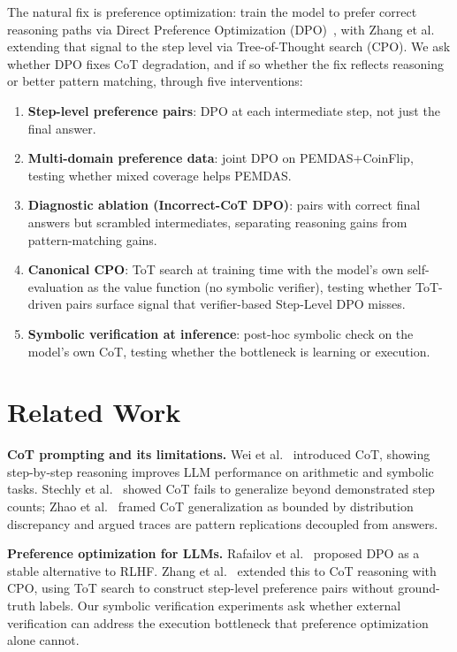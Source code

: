 \documentclass{article}
\begin{document}
The natural fix is preference optimization: train the model to prefer correct reasoning paths via Direct Preference Optimization (DPO)~\cite{rafailov2023dpo}, with Zhang et al.~\cite{zhang2024cpo} extending that signal to the step level via Tree-of-Thought search (CPO). We ask whether DPO fixes CoT degradation, and if so whether the fix reflects reasoning or better pattern matching, through five interventions:
\begin{enumerate}
  \item \textbf{Step-level preference pairs}: DPO at each intermediate step, not just the final answer.
  \item \textbf{Multi-domain preference data}: joint DPO on PEMDAS+CoinFlip, testing whether mixed coverage helps PEMDAS.
  \item \textbf{Diagnostic ablation (Incorrect-CoT DPO)}: pairs with correct final answers but scrambled intermediates, separating reasoning gains from pattern-matching gains.
  \item \textbf{Canonical CPO}: ToT search at training time with the model's own self-evaluation as the value function (no symbolic verifier), testing whether ToT-driven pairs surface signal that verifier-based Step-Level DPO misses.
  \item \textbf{Symbolic verification at inference}: post-hoc symbolic check on the model's own CoT, testing whether the bottleneck is learning or execution.
\end{enumerate}

\section{Related Work}

\textbf{CoT prompting and its limitations.} Wei et al.~\cite{wei2022cot} introduced CoT, showing step-by-step reasoning improves LLM performance on arithmetic and symbolic tasks. Stechly et al.~\cite{stechly2024thoughtlessness} showed CoT fails to generalize beyond demonstrated step counts; Zhao et al.~\cite{zhao2024mirage} framed CoT generalization as bounded by distribution discrepancy and argued traces are pattern replications decoupled from answers.

\textbf{Preference optimization for LLMs.} Rafailov et al.~\cite{rafailov2023dpo} proposed DPO as a stable alternative to RLHF. Zhang et al.~\cite{zhang2024cpo} extended this to CoT reasoning with CPO, using ToT search to construct step-level preference pairs without ground-truth labels. Our symbolic verification experiments ask whether external verification can address the execution bottleneck that preference optimization alone cannot.
\end{document}
